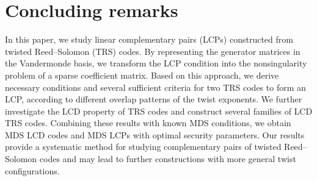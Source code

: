 \documentclass[12pt,draftcls,journal,onecolumn]{IEEEtran}
\begin{document}
\section{Concluding remarks}

In this paper, we study linear complementary pairs (LCPs) constructed from twisted Reed--Solomon (TRS) codes. By representing the generator matrices in the Vandermonde basis, we transform the LCP condition into the nonsingularity problem of a sparse coefficient matrix. Based on this approach, we derive necessary conditions and several sufficient criteria for two TRS codes to form an LCP, according to different overlap patterns of the twist exponents. We further investigate the LCD property of TRS codes and construct several families of LCD TRS codes. Combining these results with known MDS conditions, we obtain MDS LCD codes and MDS LCPs with optimal security parameters. Our results provide a systematic method for studying complementary pairs of twisted Reed--Solomon codes and may lead to further constructions with more general twist configurations.
\end{document}
